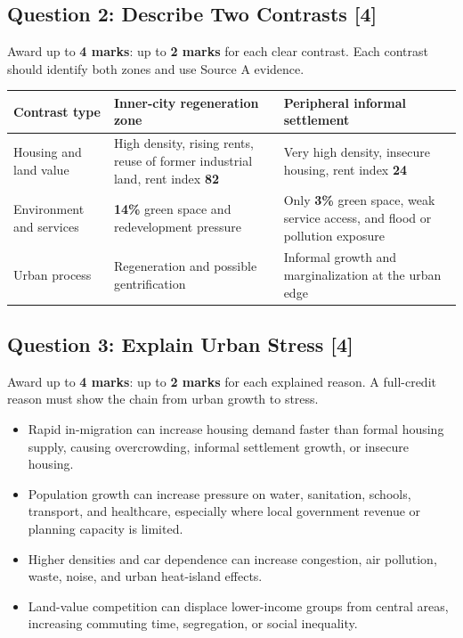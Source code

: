\documentclass[11pt,a4paper]{article}
\newcommand{\term}[1]{\textcolor{HeadingBlue}{\textbf{#1}}}
\begin{document}
\subsection{Question 2: Describe Two Contrasts [4]}

Award up to \term{4 marks}: up to \term{2 marks} for each clear contrast. Each
contrast should identify both zones and use Source A evidence.

\begin{tabularx}{\textwidth}{L{0.22\textwidth}Y Y}
\toprule
\textbf{Contrast type} & \textbf{Inner-city regeneration zone} & \textbf{Peripheral informal settlement} \\
\midrule
Housing and land value & High density, rising rents, reuse of former
industrial land, rent index \term{82} & Very high density, insecure housing,
rent index \term{24} \\
Environment and services & \term{14\%} green space and redevelopment pressure
& Only \term{3\%} green space, weak service access, and flood or pollution
exposure \\
Urban process & Regeneration and possible gentrification & Informal growth
and marginalization at the urban edge \\
\bottomrule
\end{tabularx}

\subsection{Question 3: Explain Urban Stress [4]}

Award up to \term{4 marks}: up to \term{2 marks} for each explained reason.
A full-credit reason must show the chain from urban growth to stress.

\begin{itemize}
  \item Rapid in-migration can increase housing demand faster than formal
  housing supply, causing overcrowding, informal settlement growth, or insecure
  housing.
  \item Population growth can increase pressure on water, sanitation, schools,
  transport, and healthcare, especially where local government revenue or
  planning capacity is limited.
  \item Higher densities and car dependence can increase congestion, air
  pollution, waste, noise, and urban heat-island effects.
  \item Land-value competition can displace lower-income groups from central
  areas, increasing commuting time, segregation, or social inequality.
\end{itemize}
\end{document}
